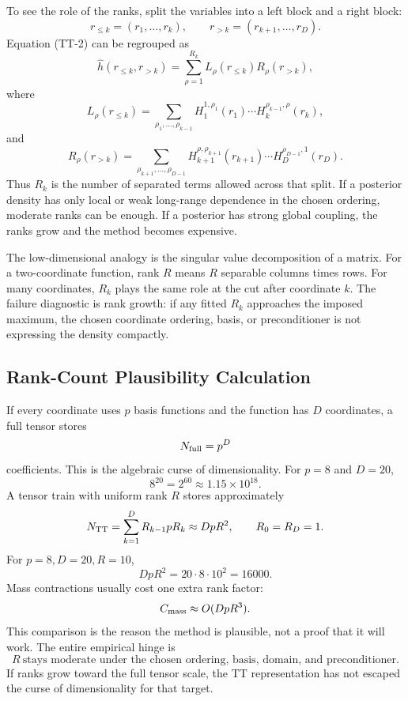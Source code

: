 \documentclass[11pt]{article}
\begin{document}
To see the role of the ranks, split the variables into a left block and a right
block:
\[
    r_{\le k}=(r_1,\ldots,r_k),\qquad
    r_{>k}=(r_{k+1},\ldots,r_D).
\]
Equation (TT-2) can be regrouped as
\[
    \widehat h(r_{\le k},r_{>k})
    =
    \sum_{\rho=1}^{R_k}
    L_\rho(r_{\le k})R_\rho(r_{>k}),
    \label{eq:p24-tt-2a}
\]
where
\[
    L_\rho(r_{\le k})
    =
    \sum_{\rho_1,\ldots,\rho_{k-1}}
    H_1^{1,\rho_1}(r_1)\cdots H_k^{\rho_{k-1},\rho}(r_k),
\]
and
\[
    R_\rho(r_{>k})
    =
    \sum_{\rho_{k+1},\ldots,\rho_{D-1}}
    H_{k+1}^{\rho,\rho_{k+1}}(r_{k+1})\cdots
    H_D^{\rho_{D-1},1}(r_D).
\]
Thus \(R_k\) is the number of separated terms allowed across that split.  If a
posterior density has only local or weak long-range dependence in the chosen
ordering, moderate ranks can be enough.  If a posterior has strong global
coupling, the ranks grow and the method becomes expensive.

The low-dimensional analogy is the singular value decomposition of a matrix.
For a two-coordinate function, rank \(R\) means \(R\) separable columns times
rows.  For many coordinates, \(R_k\) plays the same role at the cut after
coordinate \(k\).  The failure diagnostic is rank growth: if any fitted
\(R_k\) approaches the imposed maximum, the chosen coordinate ordering, basis,
or preconditioner is not expressing the density compactly.

\subsection*{Rank-Count Plausibility Calculation}

If every coordinate uses \(p\) basis functions and the function has \(D\)
coordinates, a full tensor stores
\[
    N_{\rm full}=p^D
    \label{eq:p24-p23-rank1}
\]
coefficients.  This is the algebraic curse of dimensionality.  For \(p=8\) and
\(D=20\),
\[
    8^{20}=2^{60}\approx 1.15\times 10^{18}.
    \label{eq:p24-p23-rank2}
\]
A tensor train with uniform rank \(R\) stores approximately
\[
    N_{\rm TT}
    =
    \sum_{k=1}^D R_{k-1}pR_k
    \approx DpR^2,
    \qquad R_0=R_D=1.
    \label{eq:p24-p23-rank3}
\]
For \(p=8,D=20,R=10\),
\[
    DpR^2=20\cdot 8\cdot 10^2=16000.
    \label{eq:p24-p23-rank4}
\]
Mass contractions usually cost one extra rank factor:
\[
    C_{\rm mass}\approx O(DpR^3).
    \label{eq:p24-p23-rank5}
\]
This comparison is the reason the method is plausible, not a proof that it
will work.  The entire empirical hinge is
\[
    R\ \text{stays moderate under the chosen ordering, basis, domain, and
    preconditioner.}
    \label{eq:p24-p23-rank6}
\]
If ranks grow toward the full tensor scale, the TT representation has not
escaped the curse of dimensionality for that target.
\end{document}
